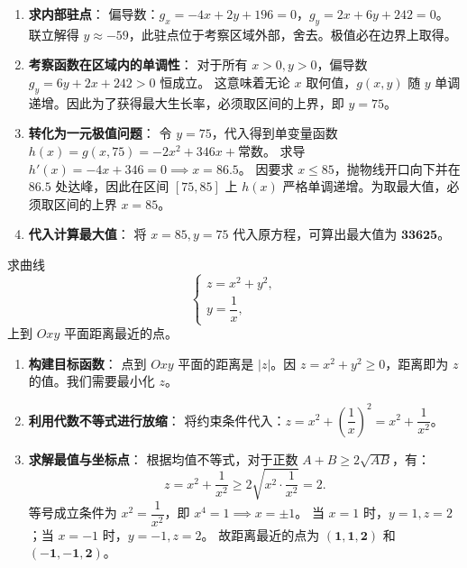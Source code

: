 \documentclass[lang=cn,11pt]{elegantbook}
\begin{document}
\begin{solution}
\begin{enumerate}
  \item \textbf{求内部驻点}：
  偏导数：$g_x = -4x + 2y + 196 = 0$，$g_y = 2x + 6y + 242 = 0$。
  联立解得 $y \approx -59$，此驻点位于考察区域外部，舍去。极值必在边界上取得。
  
  \item \textbf{考察函数在区域内的单调性}：
  对于所有 $x > 0, y > 0$，偏导数 $g_y = 6y + 2x + 242 > 0$ 恒成立。
  这意味着无论 $x$ 取何值，$g(x,y)$ 随 $y$ 单调递增。因此为了获得最大生长率，必须取区间的上界，即 $y=75$。
  
  \item \textbf{转化为一元极值问题}：
  令 $y=75$，代入得到单变量函数 $h(x) = g(x, 75) = -2x^2 + 346x + \text{常数}$。
  求导 $h'(x) = -4x + 346 = 0 \implies x = 86.5$。
  因要求 $x \leq 85$，抛物线开口向下并在 $86.5$ 处达峰，因此在区间 $[75, 85]$ 上 $h(x)$ 严格单调递增。为取最大值，必须取区间的上界 $x=85$。
  
  \item \textbf{代入计算最大值}：
  将 $x=85, y=75$ 代入原方程，可算出最大值为 $\mathbf{33625}$。
\end{enumerate}
\end{solution}



\begin{exercise}[点到空间曲线的最短距离]
求曲线
\[
\begin{cases}
z=x^2+y^2,\\[4pt]
y=\dfrac{1}{x},
\end{cases}
\]
上到 $Oxy$ 平面距离最近的点。
\end{exercise}

\begin{solution}
\begin{enumerate}
  \item \textbf{构建目标函数}：
  点到 $Oxy$ 平面的距离是 $|z|$。因 $z = x^2+y^2 \geq 0$，距离即为 $z$ 的值。我们需要最小化 $z$。
  \item \textbf{利用代数不等式进行放缩}：
  将约束条件代入：$z = x^2 + \left(\dfrac{1}{x}\right)^2 = x^2 + \dfrac{1}{x^2}$。
  \item \textbf{求解最值与坐标点}：
  根据均值不等式，对于正数 $A+B \geq 2\sqrt{AB}$，有：
  \[
  z = x^2 + \frac{1}{x^2} \geq 2\sqrt{x^2 \cdot \frac{1}{x^2}} = 2.
  \]
  等号成立条件为 $x^2 = \dfrac{1}{x^2}$，即 $x^4 = 1 \implies x = \pm 1$。
  当 $x=1$ 时，$y=1, z=2$；当 $x=-1$ 时，$y=-1, z=2$。
  故距离最近的点为 $\mathbf{(1,1,2)}$ 和 $\mathbf{(-1,-1,2)}$。
\end{enumerate}
\end{solution}
\end{document}
